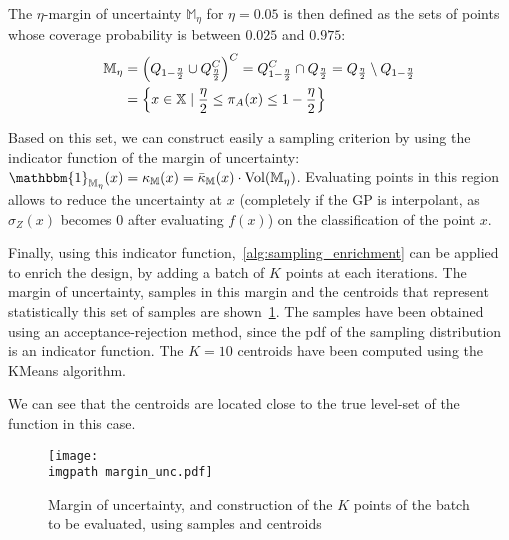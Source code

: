 \documentclass[../../Main_ManuscritThese.tex]{subfiles}
\newcommand\imgpath{/home/victor/acadwriting/Manuscrit/Text/Chapter4/img/}
\begin{document}
The $\eta$-margin of uncertainty $\mathbb{M}_{\eta}$ for $\eta=0.05$
is then defined as the sets of points whose coverage probability is
between $0.025$ and $0.975$:
\begin{align}
  \label{eq:margin_unc}
  \mathbb{M}_{\eta} &= \left(Q_{1-\frac{\eta}{2}} \cup Q^C_{\frac{\eta}{2}} \right)^C = Q_{1-\frac{\eta}{2}}^C \cap Q_{\frac{\eta}{2}} = Q_{\frac{\eta}{2}} \setminus Q_{1-\frac{\eta}{2}} \\
                    &= \left\{x \in \mathbb{X} \mid \frac{\eta}{2} \leq \pi_A(x) \leq 1 - \frac{\eta}{2} \right\}
\end{align}

Based on this set, we can construct easily a sampling criterion by
using the indicator function of the margin of uncertainty:
$\mathbbm{1}_{\mathbb{M}_{\eta}}(x)=\kappa_{\mathbb{M}}(x) =
\bar{\kappa}_{\mathbb{M}}(x) \cdot \mathrm{Vol}(\mathbb{M}_{\eta})$.
 Evaluating points in this region allows to reduce
the uncertainty at $x$ (completely if the GP is interpolant, as
$\sigma_Z(x)$ becomes $0$ after evaluating $f(x)$) on the
classification of the point $x$.

Finally, using this indicator function,~\cref{alg:sampling_enrichment}
can be applied to enrich the design, by adding a batch of $K$ points
at each iterations.  The margin of uncertainty, samples
in this margin and the centroids that represent statistically this set
of samples are shown~\cref{fig:margin_unc}. The samples have been
obtained using an acceptance-rejection method, since the pdf of the
sampling distribution is an indicator function. The $K=\num{10}$
centroids have been computed using the KMeans algorithm.

We can see that the centroids are located close to the true level-set of the function in this case.
\begin{figure}[ht]
  \centering
  \texttt{[image: \\imgpath margin\_unc.pdf]}
  \caption[Samples in the margin of uncertainties and centroids]{\label{fig:margin_unc} Margin of uncertainty, and
    construction of the $K$ points of the batch to be evaluated, using
    samples and centroids}
\end{figure}

\end{document}
